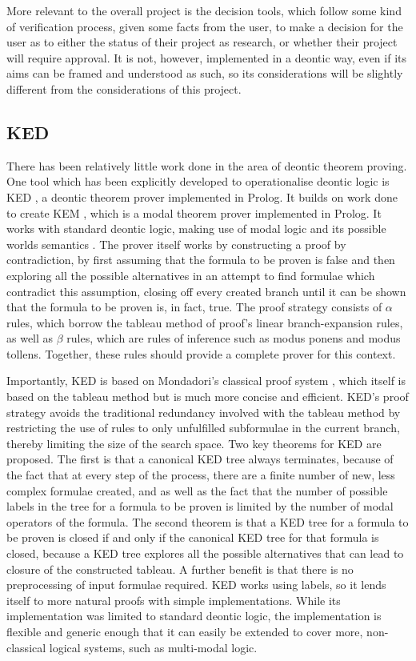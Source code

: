 \documentclass{l4proj}
\begin{document}
More relevant to the overall project is the decision tools, which follow some kind of verification process, given some facts from the user, to make a decision for the user as to either the status of their project as research, or whether their project will require approval. It is not, however, implemented in a deontic way, even if its aims can be framed and understood as such, so its considerations will be slightly different from the considerations of this project. 

\subsection{KED}
There has been relatively little work done in the area of deontic theorem proving. One tool which has been explicitly developed to operationalise deontic logic is KED \cite{KED}, a deontic theorem prover implemented in Prolog. It builds on work done to create KEM \cite{KEM}, which is a modal theorem prover implemented in Prolog. It works with standard deontic logic, making use of modal logic and its possible worlds semantics \cite{sep-possible-worlds}. The prover itself works by constructing a proof by contradiction, by first assuming that the formula to be proven is false and then exploring all the possible alternatives in an attempt to find formulae which contradict this assumption, closing off every created branch until it can be shown that the formula to be proven is, in fact, true. The proof strategy consists of $\alpha$ rules, which borrow the tableau method of proof's linear branch-expansion rules, as well as $\beta$ rules, which are rules of inference such as modus ponens and modus tollens. Together, these rules should provide a complete prover for this context. 

Importantly, KED is based on Mondadori's classical proof system \cite{Mondadori}, which itself is based on the tableau method but is much more concise and efficient. KED's proof strategy avoids the traditional redundancy involved with the tableau method by restricting the use of rules to only unfulfilled subformulae in the current branch, thereby limiting the size of the search space. Two key theorems for KED are proposed. The first is that a canonical KED tree always terminates, because of the fact that at every step of the process, there are a finite number of new, less complex formulae created, and as well as the fact that the number of possible labels in the tree for a formula to be proven is limited by the number of modal operators of the formula. The second theorem is that a KED tree for a formula to be proven is closed if and only if the canonical KED tree for that formula is closed, because a KED tree explores all the possible alternatives that can lead to closure of the constructed tableau. A further benefit is that there is no preprocessing of input formulae required. KED works using labels, so it lends itself to more natural proofs with simple implementations. While its implementation was limited to standard deontic logic, the implementation is flexible and generic enough that it can easily be extended to cover more, non-classical logical systems, such as multi-modal logic. 
\end{document}
